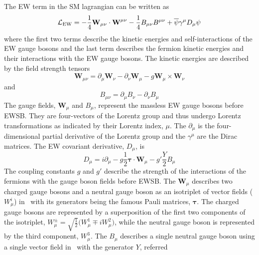 The EW term in the SM lagrangian can be written as
\begin{equation}
\begin{aligned}
\curlyl_{\textrm{EW}} = -\frac{1}{4}\textbf{W}_{\mu\nu} \cdot \textbf{W}^{\mu\nu} 
- \frac{1}{4} B_{\mu\nu} B^{\mu\nu}  +\overline{\psi}\gamma^{\mu}D_{\mu}\psi
\end{aligned}
\label{eq:lagrangian_ew}
\end{equation}
where the first two terms describe the kinetic energies and 
self-interactions of the EW gauge bosons
and the last term describes the fermion kinetic energies
and their interactions with the EW gauge bosons.
The kinetic energies are described by the field strength tensors
\begin{equation}
\label{eq:wfieldstrength}
\textbf{W}_{\mu\nu} = \partial_{\mu}\textbf{W}_{\nu} - \partial_{\nu}\textbf{W}_{\mu} - g \textbf{W}_{\mu}\times \textbf{W}_{\nu}
\end{equation}
and 
\begin{equation}
\label{eq:bfieldstrength}
B_{\mu\nu} = \partial_{\mu} B_{\nu} - \partial_{\nu} B_{\mu}
\end{equation}
The gauge fields, $\mathbf{W}_{\mu}$ and $B_{\mu}$, represent the 
massless EW gauge bosons before EWSB. They are four-vectors of the Lorentz group
and thus undergo Lorentz transformations as indicated by their Lorentz index, $\mu$.
The $\partial_{\mu}$ is the four-dimensional partial derivative of the Lorentz
group and the $\gamma^{\mu}$ are the Dirac matrices.
The EW covariant derivative, $D_{\mu}$, is
\begin{equation}
D_{\mu} =  i \partial_{\mu} - g \frac{1}{2} \boldsymbol{\tau} \cdot \textbf{W}_{\mu} - g' \frac{Y}{2} B_{\mu} 
\label{eq:ew_covariant_derivative}
\end{equation}
The coupling constants $g$ and $g'$ describe the strength of the interactions
of the fermions with the gauge boson fields before EWSB. 
The $\mathbf{W}_{\mu}$ describes two charged gauge bosons and 
a neutral gauge boson as an isotriplet of 
vector fields ($W_{\mu}^i$)
in \sutwo~with its generators being the famous Pauli matrices, $\boldsymbol{\tau}$.
The charged gauge bosons are represented by a superposition of the first
two components of the 
isotriplet, $W_{\mu}^{\pm}=\sqrt{\frac{1}{2}}\Big(W_{\mu}^1\mp i W_{\mu}^2\Big)$,
while the neutral gauge boson is represented 
by the third component, $W_{\mu}^3$.
The $B_{\mu}$ describes a single neutral gauge boson 
using a single vector field in \uone~with the generator $Y$, referred
